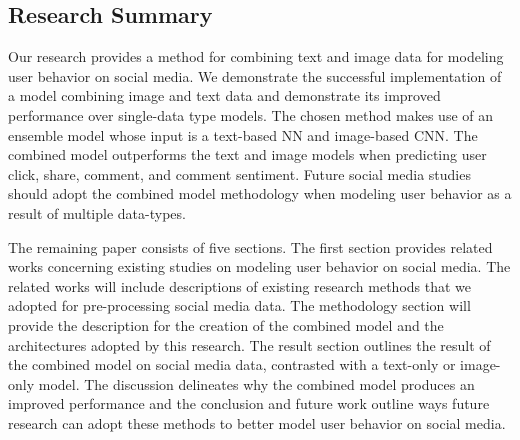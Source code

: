 \documentclass{article}
\begin{document}


\subsection{Research Summary}

Our research provides a method for combining text and image data for modeling user behavior on social media. We demonstrate the successful implementation of a model combining image and text data and demonstrate its improved performance over single-data type models. The chosen method makes use of an ensemble model whose input is a text-based NN and image-based CNN. The combined model outperforms the text and image models when predicting user click, share, comment, and comment sentiment. Future social media studies should adopt the combined model methodology when modeling user behavior as a result of multiple data-types.

The remaining paper consists of five sections.  The first section provides related works concerning existing studies on modeling user behavior on social media. The related works will include descriptions of existing research methods that we adopted for pre-processing social media data.  The methodology section will provide the description for the creation of the combined model and the architectures adopted by this research. The result section outlines the result of the combined model on social media data, contrasted with a text-only or image-only model.  The discussion delineates why the combined model produces an improved performance and the conclusion and future work outline ways future research can adopt these methods to better model user behavior on social media.
\end{document}
